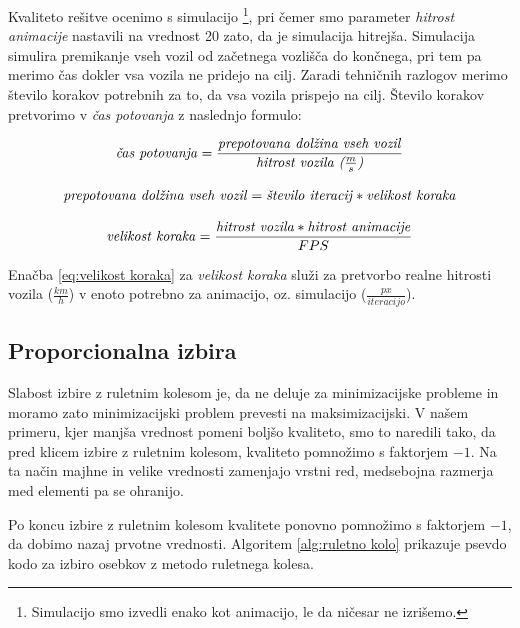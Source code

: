 \documentclass[a4paper, 12pt]{book}
\begin{document}
Kvaliteto re\v sitve ocenimo s simulacijo \footnote{Simulacijo smo izvedli enako kot animacijo, le da ni\v cesar ne izri\v semo.}, pri \v cemer smo parameter \textit{hitrost animacije} nastavili na vrednost 20 zato, da je simulacija hitrej\v sa. Simulacija simulira premikanje vseh vozil od za\v cetnega vozli\v s\v ca do kon\v cnega, pri tem pa merimo \v cas dokler vsa vozila ne pridejo na cilj. Zaradi tehni\v cnih razlogov merimo \v stevilo korakov potrebnih za to, da vsa vozila prispejo na cilj. \v Stevilo korakov pretvorimo v \textit{\v cas potovanja} z naslednjo formulo:

\begin{equation}
\textrm{\textit{\v cas potovanja}} = \frac{\textrm{\textit{prepotovana dol\v zina vseh vozil}}}{\textrm{\textit{hitrost vozila ($\frac{m}{s}$)}}}
\end{equation}

\begin{equation}
\textrm{\textit{prepotovana dol\v zina vseh vozil}} = \textrm{\textit{\v stevilo iteracij}}*\textrm{\textit{velikost koraka}}
\label{eq:prepotovana dolzina}
\end{equation}

\begin{equation}
\textrm{\textit{velikost koraka}} = \frac{\textrm{\textit{hitrost vozila}}*\textrm{\textit{hitrost animacije}}}{FPS}
\label{eq:velikost koraka}
\end{equation}

Ena\v cba \ref{eq:velikost koraka} za \textit{velikost koraka} slu\v zi za pretvorbo realne hitrosti vozila ($\frac{km}{h}$) v enoto potrebno za animacijo, oz. simulacijo ($\frac{px}{iteracijo}$).

\subsection{Proporcionalna izbira}
Slabost izbire z ruletnim kolesom je, da ne deluje za minimizacijske probleme in moramo zato minimizacijski problem prevesti na maksimizacijski. V na\v sem primeru, kjer manj\v sa vrednost pomeni bolj\v so kvaliteto, smo to naredili tako, da pred klicem izbire z ruletnim kolesom, kvaliteto pomno\v zimo s faktorjem $-1$. Na ta na\v cin majhne in velike vrednosti zamenjajo vrstni red, medsebojna razmerja med elementi pa se ohranijo. 

Po koncu izbire z ruletnim kolesom kvalitete ponovno pomno\v zimo s faktorjem $-1$, da dobimo nazaj prvotne vrednosti. Algoritem \ref{alg:ruletno kolo} prikazuje psevdo kodo za izbiro osebkov z metodo ruletnega kolesa.
\end{document}
